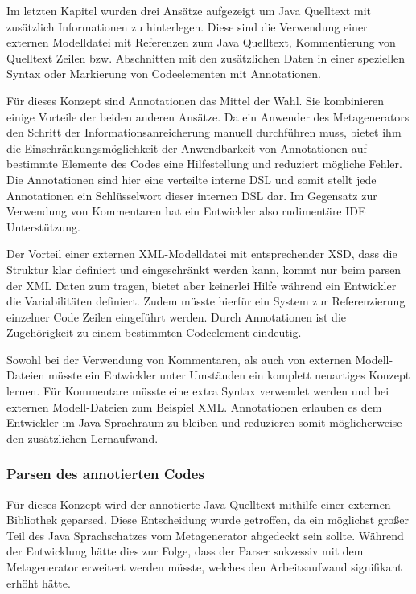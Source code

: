 \documentclass[12pt,oneside,a4paper,parskip]{scrbook}
\begin{document}
Im letzten Kapitel wurden drei Ansätze aufgezeigt um Java Quelltext mit zusätzlich Informationen zu hinterlegen. Diese sind die Verwendung einer externen Modelldatei mit Referenzen zum Java Quelltext, Kommentierung von Quelltext Zeilen bzw. Abschnitten mit den zusätzlichen Daten in einer speziellen Syntax oder Markierung von Codeelementen mit Annotationen.

Für dieses Konzept sind Annotationen das Mittel der Wahl. Sie kombinieren einige Vorteile der beiden anderen Ansätze. Da ein Anwender des Metagenerators den Schritt der Informationsanreicherung manuell durchführen muss, bietet ihm die Einschränkungsmöglichkeit der Anwendbarkeit von Annotationen auf bestimmte Elemente des Codes eine Hilfestellung und reduziert mögliche Fehler. Die Annotationen sind hier eine verteilte interne DSL und somit stellt jede Annotationen ein Schlüsselwort dieser internen DSL dar. Im Gegensatz zur Verwendung von Kommentaren hat ein Entwickler also rudimentäre IDE Unterstützung. 

Der Vorteil einer externen XML-Modelldatei mit entsprechender XSD, dass die Struktur klar definiert und eingeschränkt werden kann, kommt nur beim parsen der XML Daten zum tragen, bietet aber keinerlei Hilfe während ein Entwickler die Variabilitäten definiert. Zudem müsste hierfür ein System zur Referenzierung einzelner Code Zeilen eingeführt werden. Durch Annotationen ist die Zugehörigkeit zu einem bestimmten Codeelement eindeutig.

Sowohl bei der Verwendung von Kommentaren, als auch von externen Modell-Dateien müsste ein Entwickler unter Umständen ein komplett neuartiges Konzept lernen. Für Kommentare müsste eine extra Syntax verwendet werden und bei externen Modell-Dateien zum Beispiel XML. Annotationen erlauben es dem Entwickler im Java Sprachraum zu bleiben und reduzieren somit möglicherweise den zusätzlichen Lernaufwand.

\subsubsection{Parsen des annotierten Codes}

Für dieses Konzept wird der annotierte Java-Quelltext mithilfe einer externen Bibliothek geparsed. Diese Entscheidung wurde getroffen, da ein möglichst großer Teil des Java Sprachschatzes vom Metagenerator abgedeckt sein sollte. Während der Entwicklung hätte dies zur Folge, dass der Parser sukzessiv mit dem Metagenerator erweitert werden müsste, welches den Arbeitsaufwand signifikant erhöht hätte.
\end{document}
